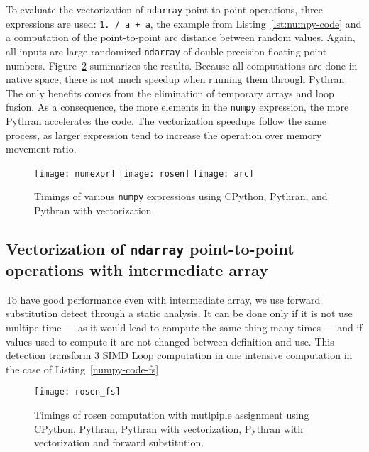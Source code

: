 \documentclass[preprint]{sigplanconf}
\begin{document}
To evaluate the vectorization of \texttt{ndarray} point-to-point operations,
three expressions are used: \texttt{1. / a + a}, the example from
Listing~\ref{lst:numpy-code} and a computation of the point-to-point arc
distance  between random values. Again, all inputs are large randomized
\texttt{ndarray} of double precision floating point numbers.
Figure~\ref{fig:numpy-timings} summarizes the results. Because all computations
are done in native space, there is not much speedup when running them through
Pythran. The only benefits comes from the elimination of temporary arrays and
loop fusion. As a consequence, the more elements in the \texttt{numpy}
expression, the more Pythran accelerates the code. The vectorization speedups
follow the same process, as larger expression tend to increase the operation
over memory movement ratio.

\begin{figure}[ht]

    \texttt{[image: numexpr]}
    \texttt{[image: rosen]}
    \texttt{[image: arc]}
    \caption{Timings of various \texttt{numpy} expressions using CPython, Pythran, and Pythran with vectorization.}
    \label{fig:numpy-timings}

\end{figure}

\subsection{Vectorization of \texttt{ndarray} point-to-point operations with
intermediate array}

To have good performance even with intermediate array, we use forward substitution
detect through a static analysis. It can be done only if it is not use multipe time
--- as it would lead to compute the same thing many times --- and if values used
to compute it are not changed between definition and use.
This detection transform 3 SIMD Loop computation in one intensive computation in
the case of Listing~\ref{numpy-code-fs}

\begin{figure}[ht]

    \texttt{[image: rosen\_fs]}
    \caption{Timings of rosen computation with mutlpiple assignment using CPython, Pythran, Pythran with vectorization, Pythran with vectorization and forward substitution.}
    \label{fig:numpy-timings}

\end{figure}
\end{document}
